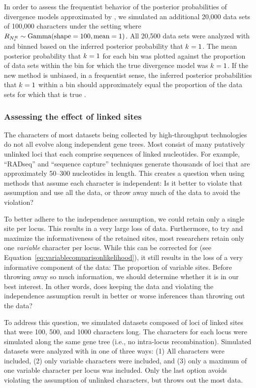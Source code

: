 In order to assess the frequentist behavior of the posterior probabilities of
divergence models approximated by \ecoevolity, we simulated an additional
20,000 data sets of 100,000 characters under the setting where
$R_{N_{e}^{R{}}} \sim \textrm{Gamma}(\textrm{shape} = 100, \textrm{mean} = 1)$.
All 20,500 data sets were analyzed with \ecoevolity and binned based on the
inferred posterior probability that $k_{} = 1$.
The mean posterior probability that $k_{} = 1$ for each bin was plotted
against the proportion of data sets within the bin for which the true
divergence model was $k_{} = 1$.
If the new method is unbiased, in a frequentist sense, the inferred posterior
probabilities that $k_{} = 1$ within a bin should approximately equal the
proportion of the data sets for which that is true
\citep{Huelsenbeck2004,Oaks2012,Oaks2014dpp}.

\subsubsection{Assessing the effect of linked sites}
The characters of most datasets being collected by high-throughput technologies
do not all evolve along independent gene trees.
Most consist of many putatively unlinked loci that each comprise sequences of
linked nucleotides.
For example, ``RADseq'' and ``sequence capture'' techniques generate thousands
of loci that are approximately 50--300 nucleotides in length.
This creates a question when using methods that assume each character is
independent:
Is it better to violate that assumption and use all the data, or throw
away much of the data to avoid the violation?

To better adhere to the independence assumption, we could retain only a single
site per locus.
This results in a very large loss of data.
Furthermore, to try and maximize the informativeness of the retained sites,
most researchers retain only one \emph{variable} character per locus.
While this can be corrected for (see
Equation~\ref{eq:variablecomparisonlikelihood}), it still results in the loss
of a very informative component of the data: The proportion of variable sites.
Before throwing away so much information, we should determine whether
it is in our best interest.
In other words, does keeping the data and violating the independence
assumption result in better or worse inferences than throwing out the 
data?

To address this question, 
we simulated datasets composed of loci of linked sites that were 100, 500, and
1000 characters long.
The characters for each locus were simulated along the same gene tree (i.e., no
intra-locus recombination).
Simulated datasets were analyzed with \ecoevolity in one of three ways:
(1) All characters were included,
(2) only variable characters were included,
and
(3) only a maximum of one variable character per locus was included.
Only the last option avoids violating the assumption of unlinked characters,
but throws out the most data.

